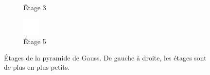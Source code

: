 \begin{figure}
\begin{subfigure}{.3\textwidth}
        \caption{Étage 3}
    \end{subfigure}
    \hfill
    \begin{subfigure}{.3\textwidth}
        \centering
        \includegraphics[width=\textwidth]{contenu/resources/images/gauss_5}
        \caption{Étage 5}
    \end{subfigure}

    \caption[Étages de la pyramide de Gauss]{Étages de la pyramide de Gauss. De gauche à droite, les étages sont de plus en plus petits.}
    \label{fig:gaussian-pyramid}
\end{figure}

